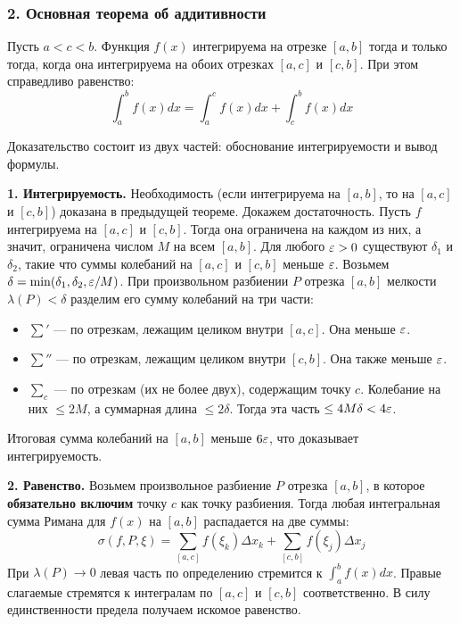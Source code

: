 \subsubsection*{2. Основная теорема об аддитивности}

\begin{theorem}
Пусть $a < c < b$. Функция $f(x)$ интегрируема на отрезке $[a, b]$ тогда и только тогда, когда она интегрируема на обоих отрезках $[a, c]$ и $[c, b]$. При этом справедливо равенство:
\[ \int_a^b f(x) dx = \int_a^c f(x) dx + \int_c^b f(x) dx \]
\end{theorem}

\begin{tcolorbox}[title=Доказательство, breakable]
Доказательство состоит из двух частей: обоснование интегрируемости и вывод формулы.

\textbf{1. Интегрируемость.} 
Необходимость (если интегрируема на $[a, b]$, то на $[a, c]$ и $[c, b]$) доказана в предыдущей теореме.
Докажем достаточность. Пусть $f$ интегрируема на $[a, c]$ и $[c, b]$. Тогда она ограничена на каждом из них, а значит, ограничена числом $M$ на всем $[a, b]$. 
Для любого $\varepsilon > 0$ существуют $\delta_1$ и $\delta_2$, такие что суммы колебаний на $[a, c]$ и $[c, b]$ меньше $\varepsilon$. Возьмем $\delta = \min(\delta_1, \delta_2, \varepsilon/M)$. 
При произвольном разбиении $P$ отрезка $[a, b]$ мелкости $\lambda(P) < \delta$ разделим его сумму колебаний на три части:
\begin{itemize}
    \item $\sum'$ — по отрезкам, лежащим целиком внутри $[a, c]$. Она меньше $\varepsilon$.
    \item $\sum''$ — по отрезкам, лежащим целиком внутри $[c, b]$. Она также меньше $\varepsilon$.
    \item $\sum_{c}$ — по отрезкам (их не более двух), содержащим точку $c$. Колебание на них $\le 2M$, а суммарная длина $\le 2\delta$. Тогда эта часть $\le 4M\delta < 4\varepsilon$.
\end{itemize}
Итоговая сумма колебаний на $[a, b]$ меньше $6\varepsilon$, что доказывает интегрируемость.

\textbf{2. Равенство.}
Возьмем произвольное разбиение $P$ отрезка $[a, b]$, в которое \textbf{обязательно включим} точку $c$ как точку разбиения. Тогда любая интегральная сумма Римана для $f(x)$ на $[a, b]$ распадается на две суммы:
\[ \sigma(f, P, \xi) = \sum_{[a, c]} f(\xi_k) \Delta x_k + \sum_{[c, b]} f(\xi_j) \Delta x_j \]
При $\lambda(P) \to 0$ левая часть по определению стремится к $\int_a^b f(x) dx$. Правые слагаемые стремятся к интегралам по $[a, c]$ и $[c, b]$ соответственно. В силу единственности предела получаем искомое равенство.
\end{tcolorbox}

